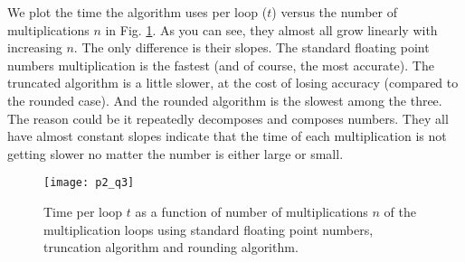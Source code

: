 \Answer We plot the time the algorithm uses per loop (\(t\)) versus the number of
multiplications \(n\) in Fig. \ref{fig:time_loop}. As you can see,
they almost all grow linearly with increasing \(n\). The only difference is their slopes.
The standard floating point numbers multiplication is the fastest (and of course, the most
accurate). The truncated algorithm is a little slower, at the cost of losing
accuracy (compared to the rounded case). And the rounded algorithm is the slowest
among the three. The reason could be it repeatedly decomposes and composes numbers.
They all have almost constant slopes indicate that the time of each multiplication
is not getting slower no matter the number is either large or small.

\begin{figure}[H]
    \centering
    \texttt{[image: p2\_q3]}
    \caption{Time per loop \(t\) as a function of number of multiplications \(n\) of
        the multiplication loops using standard floating point numbers,
        truncation algorithm and rounding algorithm.}
    \label{fig:time_loop}
\end{figure}

\newpage
